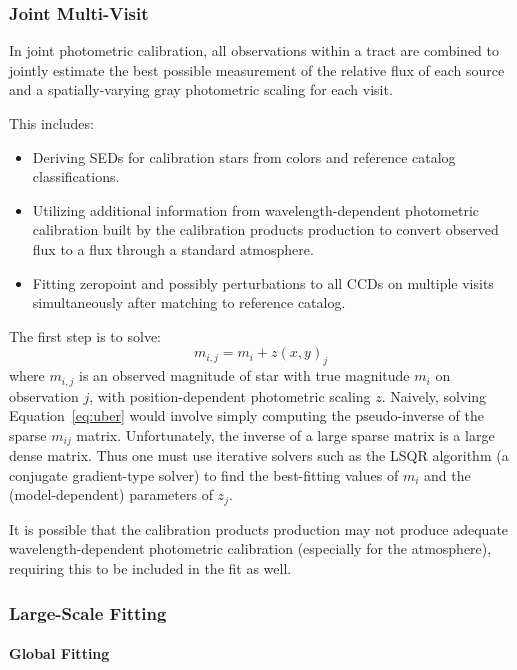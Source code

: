 \subsubsection{Joint Multi-Visit}
\label{sec:acJointPhotometricFit}

In joint photometric calibration, all observations within a tract are combined to jointly estimate the best possible measurement of the relative flux of each source and a spatially-varying gray photometric scaling for each visit.

This includes:
\begin{itemize}
\item Deriving SEDs for calibration stars from colors and reference catalog classifications.
\item Utilizing additional information from wavelength-dependent photometric calibration built by the calibration products production to convert observed flux to a flux through a standard atmosphere.
\item Fitting zeropoint and possibly perturbations to all CCDs on multiple visits simultaneously after matching to reference catalog.
\end{itemize}

The first step is to solve:
\begin{equation} \label{eq:uber}
m_{i,j} = m_i + z(x, y)_j
\end{equation}
where $m_{i,j}$ is an observed magnitude of star with true magnitude $m_i$ on observation $j$, with position-dependent photometric scaling $z$.   Naively, solving Equation~\ref{eq:uber} would involve simply computing the pseudo-inverse of the sparse $m_{ij}$ matrix. Unfortunately, the inverse of a large sparse matrix is a large dense matrix.  Thus one must use iterative solvers such as the LSQR algorithm (a conjugate gradient-type solver) to find the best-fitting values of $m_i$ and the (model-dependent) parameters of $z_j$.

It is possible that the calibration products production may not produce adequate wavelength-dependent photometric calibration (especially for the atmosphere), requiring this to be included in the fit as well.

\subsubsection{Large-Scale Fitting}

\paragraph{Global Fitting}
\label{sec:acGlobalPhotometricFit}

